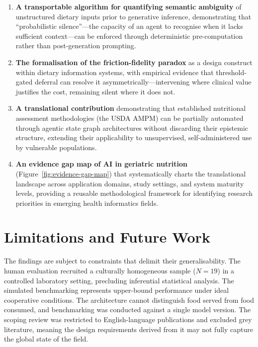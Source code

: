 \begin{enumerate}
    \item \textbf{A transportable algorithm for quantifying semantic ambiguity} of unstructured dietary inputs prior to generative inference, demonstrating that ``probabilistic silence''---the capacity of an agent to recognise when it lacks sufficient context---can be enforced through deterministic pre-computation rather than post-generation prompting.

    \item \textbf{The formalisation of the friction-fidelity paradox} as a design construct within dietary information systems, with empirical evidence that threshold-gated deferral can resolve it asymmetrically---intervening where clinical value justifies the cost, remaining silent where it does not.

    \item \textbf{A translational contribution} demonstrating that established nutritional assessment methodologies (the USDA AMPM) can be partially automated through agentic state graph architectures without discarding their epistemic structure, extending their applicability to unsupervised, self-administered use by vulnerable populations.

    \item \textbf{An evidence gap map of AI in geriatric nutrition} (Figure~\ref{fig:evidence-gap-map}) that systematically charts the translational landscape across application domains, study settings, and system maturity levels, providing a reusable methodological framework for identifying research priorities in emerging health informatics fields.
\end{enumerate}

\section{Limitations and Future Work}

The findings are subject to constraints that delimit their generalisability. The human evaluation recruited a culturally homogeneous sample ($N=19$) in a controlled laboratory setting, precluding inferential statistical analysis. The simulated benchmarking represents upper-bound performance under ideal cooperative conditions. The architecture cannot distinguish food served from food consumed, and benchmarking was conducted against a single model version. The scoping review was restricted to English-language publications and excluded grey literature, meaning the design requirements derived from it may not fully capture the global state of the field.


